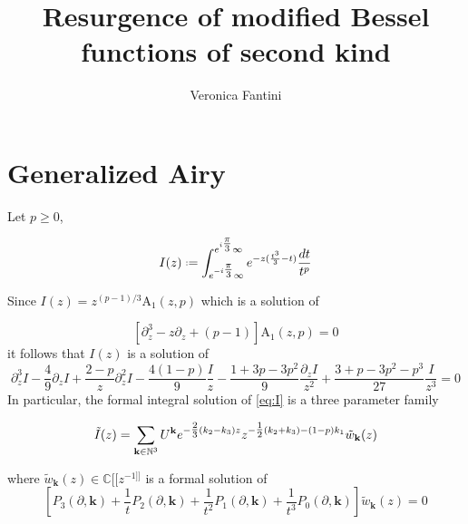 \documentclass{article}
\title{Resurgence of modified Bessel functions of second kind}
\author{Veronica Fantini}
\newcommand{\C}{\mathbb{C}}
\begin{document}
\maketitle

\section{Generalized Airy}

Let $p\geq 0$,  

\begin{equation}
I(z)\defeq\int_{e^{-i\tfrac{\pi}{3}}\infty}^{e^{i\tfrac{\pi}{3}}\infty}e^{-z(\frac{t^3}{3}-t)}\frac{dt}{t^p}
\end{equation}

Since $I(z)=z^{(p-1)/3}\mathrm{A}_1(z,p)$ which is a solution of 

\begin{equation}
\left[\partial_z^3-z\partial_z+(p-1)\right]\mathrm{A}_1(z,p)=0
\end{equation}
 it follows that $I(z)$ is a solution of 
\begin{equation}\label{eq:I}
\partial_z^3I-\frac{4}{9}\partial_zI+\frac{2-p}{z}\partial_z^2I-\frac{4(1-p)}{9}\frac{I}{z}-\frac{1+3p-3p^2}{9}\frac{\partial_zI}{z^2}+\frac{3+p-3p^2-p^3}{27}\frac{I}{z^3}=0
\end{equation}
 In particular, the formal integral solution of \eqref{eq:I} is a three parameter family 

\begin{equation}
\tilde{I}(z)=\sum_{\mathbf{k}\in\mathbb N^3}U^\mathbf{k}e^{-\tfrac{2}{3}(k_2-k_3)z}z^{-\tfrac{1}{2}(k_2+k_3)-(1-p)k_1}\tilde{w}_{\mathbf{k}}(z)
\end{equation} 

where $\tilde{w}_\mathbf{k}(z)\in\C[\![z^{-1]\!]}$ is a formal solution of 
\begin{equation}
\left[P_3(\partial,\mathbf{k})+\frac{1}{t}P_2(\partial,\mathbf{k})+\frac{1}{t^2}P_1(\partial,\mathbf{k})+\frac{1}{t^3}P_0(\partial,\mathbf{k})\right]\tilde{w}_{\mathbf{k}}(z)=0
\end{equation}
\end{document}
